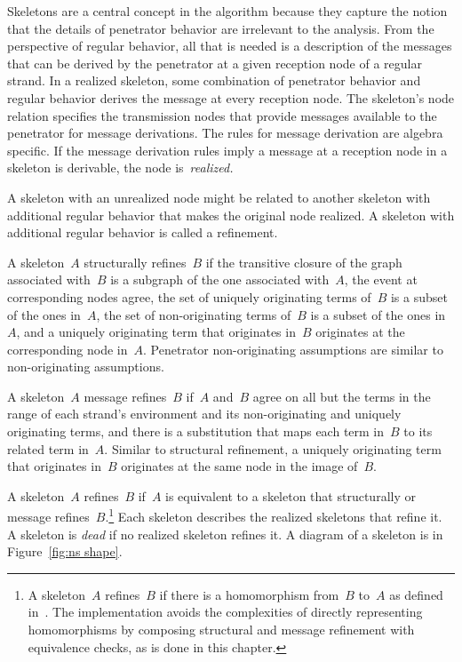 \documentclass[12pt]{article}
\begin{document}
Skeletons are a central concept in the {\cpsa} algorithm because they
capture the notion that the details of penetrator behavior are
irrelevant to the analysis.  From the perspective of regular behavior,
all that is needed is a description of the messages that can be
derived by the penetrator at a given reception node of a regular
strand.  In a realized skeleton, some combination of penetrator
behavior and regular behavior derives the message at every reception
node.  The skeleton's node relation specifies the transmission nodes
that provide messages available to the penetrator for message
derivations.  The rules for message derivation are algebra specific.
If the message derivation rules imply a message at a reception node in a
skeleton is derivable, the node is~\emph{realized.}

A skeleton with an unrealized node might be related to another
skeleton with additional regular behavior that makes the original node
realized.  A skeleton with additional regular behavior is called a
refinement.

A skeleton~$A$ structurally refines~$B$ if the transitive closure of the
graph associated with~$B$ is a subgraph of the one associated
with~$A$, the event at corresponding nodes agree, the set of
uniquely originating terms of~$B$ is a subset of the ones in~$A$, the
set of non-originating terms of~$B$ is a subset of the ones in~$A$,
and a uniquely originating term that originates in~$B$ originates at
the corresponding node in~$A$.  Penetrator non-originating assumptions
are similar to non-originating assumptions.

A skeleton~$A$ message refines~$B$ if~$A$ and~$B$ agree on all but the
terms in the range of each strand's environment and its
non-originating and uniquely originating terms, and there is a
substitution that maps each term in~$B$ to its related term in~$A$.
Similar to structural refinement, a uniquely originating term that
originates in~$B$ originates at the same node in the image of~$B$.

A skeleton~$A$ refines~$B$ if~$A$ is equivalent to a
skeleton that structurally or message refines~$B$.\footnote{A
  skeleton~$A$ refines~$B$ if there is a homomorphism from~$B$ to~$A$
  as defined in~\cite{DoghmiGuttmanThayer07}.  The implementation
  avoids the complexities of directly representing homomorphisms by
  composing structural and message refinement with equivalence checks,
  as is done in this chapter.}  Each skeleton describes the realized
skeletons that refine it.  A skeleton is \emph{dead} if no realized
skeleton refines it.  A diagram of a skeleton is in Figure~\ref{fig:ns
  shape}.
\end{document}
